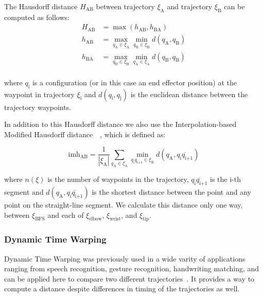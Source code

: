\documentclass[letterpaper, 10 pt, conference]{ieeeconf}  %
\begin{document}
The Hausdorff distance $H_\text{AB}$ between trajectory $\xi_\text{A}$ and trajectory $\xi_\text{B}$ can be computed as follows:
\begin{equation}
\begin{aligned}
H_\text{AB} &= \max (h_{\text{AB}}, h_{\text{BA}}) \\
h_{\text{AB}} &= \max_{q_\text{A} \in \xi_\text{A}} \min_{q_\text{B} \in \xi_\text{B}} d(q_\text{A}, q_\text{B})\\
h_{\text{BA}} &= \max_{q_\text{B} \in \xi_\text{B}} \min_{q_\text{A} \in \xi_\text{A}} d(q_\text{B}, q_\text{B})\\
\end{aligned}
\end{equation}

where $q_\text{i}$ is a configuration (or in this case an end effector position) at the waypoint in trajectory $\xi_\text{i}$ and $d(q_\text{i}, q_\text{j})$ is the euclidean distance between the trajectory waypoints.

In addition to this Hausdorff distance we also use the Interpolation-based Modified Hausdorff distance~\cite{dubuisson1994modified}~\cite{chen2013dynamic}, which is defined as:

\begin{equation}
\text{imh}_\text{AB} = \frac{1}{|\xi_\text{A}|} \sum_{q_\text{A} \in \xi_\text{A}} \min_{\overline{q_\text{i}q_\text{i+1}} \in \xi_\text{B}} d(q_\text{A}, \overline{q_\text{i}q_\text{i+1}})
\end{equation}

where $n(\xi)$ is the number of waypoints in the trajectory, $\overline{q_\text{i}q_\text{i+1}}$ is the i-th segment and $d(q_\text{A}, \overline{q_\text{i}q_\text{i+1}})$ is the shortest distance between the point and any point on the straight-line segment. We calculate this distance only one way, between $\xi_{\text{BFS}}$ and each of $\xi_\text{elbow}$, $\xi_\text{wrist}$, and $\xi_\text{tip}$.

\subsubsection{Dynamic Time Warping}

Dynamic Time Warping was previously used in a wide varity of applications ranging from speech recognition, gesture recognition, handwriting matching, and can be applied here to compare two different trajectories~\cite{senin2008dynamic}\cite{chen2013dynamic}. It provides a way to compute a distance despite differences in timing of the trajectories as well.
\end{document}
